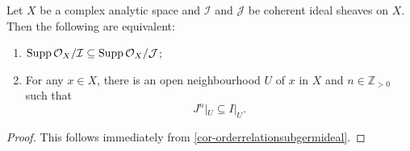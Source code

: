 \begin{corollary}
    Let $X$ be a complex analytic space and $\mathcal{I}$ and $\mathcal{J}$ be coherent ideal sheaves on $X$. Then the following are equivalent:
    \begin{enumerate}
        \item $\operatorname{Supp} \mathcal{O}_X/\mathcal{I}\subseteq \operatorname{Supp} \mathcal{O}_X/\mathcal{J}$;
        \item For any $x\in X$, there is an open neighbourhood $U$ of $x$ in $X$ and $n\in \mathbb{Z}_{>0}$ such that
            \[
                J^n|_U\subseteq I|_U.
            \]
    \end{enumerate}
\end{corollary}
\begin{proof}
    This follows immediately from \cref{cor-orderrelationsubgermideal}.
\end{proof}


\printbibliography
